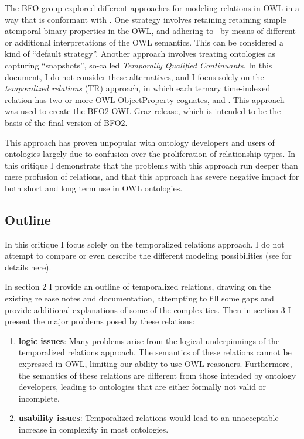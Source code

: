 \documentclass{bioinfo}
\def\P1{\pr{P-1}}
\begin{document}
The BFO group explored different approaches for modeling relations in
OWL in a way that is conformant with \P1. One strategy involves
retaining retaining simple atemporal binary properties in the OWL, and
adhering to \P1\ by means of different or additional interpretations
of the OWL semantics\cite{Grewe}. This can be considered a kind of
``default strategy''.  Another approach involves treating ontologies
as capturing ``snapshots'', so-called \emph{Temporally Qualified
  Continuants}. In this document, I do not consider these
alternatives, and I focus solely on the \emph{temporalized relations}
(TR) approach, in which each ternary time-indexed relation has two or
more OWL ObjectProperty cognates,  and
. This approach was used to create the BFO2 OWL
Graz release\cite{Graz}, which is intended to be the basis of the
final version of BFO2.

This approach has proven unpopular with ontology developers and users
of ontologies largely due to confusion over the proliferation of
relationship types\cite{BFO2InformalSurvey}. In this critique I
demonstrate that the problems with this approach run deeper than mere
profusion of relations, and that this approach has severe negative
impact for both short and long term use in OWL ontologies.

\subsection{Outline}

In this critique I focus solely on the temporalized relations
approach. I do not attempt to compare or even describe the different
modeling possibilities (see \cite{Grewe} for details here).

In section 2 I provide an outline of temporalized relations, drawing on
the existing release notes and documentation, attempting to fill some
gaps and provide additional explanations of some of the
complexities. Then in section 3 I present the major problems posed by
these relations:

\begin{enumerate}

\item \textbf{logic issues}: Many problems arise from the logical
  underpinnings of the temporalized relations approach. The semantics
  of these relations cannot be expressed in OWL, limiting our ability
  to use OWL reasoners. Furthermore, the semantics of these relations
  are different from those intended by ontology developers, leading to
  ontologies that are either formally not valid or incomplete.

\item \textbf{usability issues}: Temporalized relations would lead to
  an unacceptable increase in complexity in most ontologies.

\end{enumerate}
\end{document}

